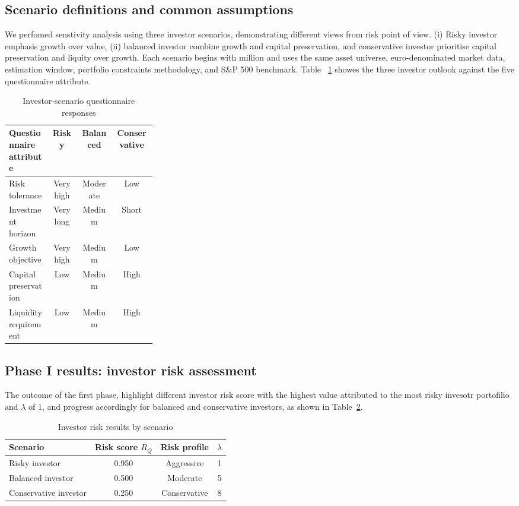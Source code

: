 \documentclass[11pt,a4paper]{article}
\newcommand{\EUR}{\texteuro}
\begin{document}
\subsection{Scenario definitions and common assumptions}

We perfomed senstivity analysis using three investor scenarios, demonstrating different views from risk point of view. (i) Risky investor emphasis growth over value, (ii) balanced investor combine growth and capital preservation, and conservative investor prioritise capital preservation and liquity over growth. Each scenario begins with \EUR1 million and uses the same asset universe, euro-denominated market data, estimation window, portfolio constraints methodology, and S\&P 500 benchmark. Table ~\ref{tab:scenario-profiles} showes the three investor outlook against the five questionnaire attribute.

\begin{table}[H]
  \centering
  \small
  \caption{Investor-scenario questionnaire responses}
  \label{tab:scenario-profiles}
  \begin{tabular}{p{0.29\linewidth}ccc}
    \toprule
    Questionnaire attribute & Risky & Balanced & Conservative \\
    \midrule
    Risk tolerance & Very high & Moderate & Low \\
    Investment horizon & Very long & Medium & Short \\
    Growth objective & Very high & Medium & Low \\
    Capital preservation & Low & Medium & High \\
    Liquidity requirement & Low & Medium & High \\
    \bottomrule
  \end{tabular}
\end{table}

\subsection{Phase I results: investor risk assessment}

The outcome of the first phase, highlight different investor risk score with the highest value attributed to the most risky invesotr portofilio and $\lambda$ of 1, and progress accordingly for balanced and conservative investors, as shown in Table~\ref{tab:scenario-risk-results}.

\begin{table}[H]
  \centering
  \caption{Investor risk results by scenario}
  \label{tab:scenario-risk-results}
  \begin{tabular}{lccc}
    \toprule
    Scenario & Risk score $R_Q$ & Risk profile & $\lambda$ \\
    \midrule
    Risky investor & 0.950 & Aggressive & 1 \\
    Balanced investor & 0.500 & Moderate & 5 \\
    Conservative investor & 0.250 & Conservative & 8 \\
    \bottomrule
  \end{tabular}
\end{table}
\end{document}
